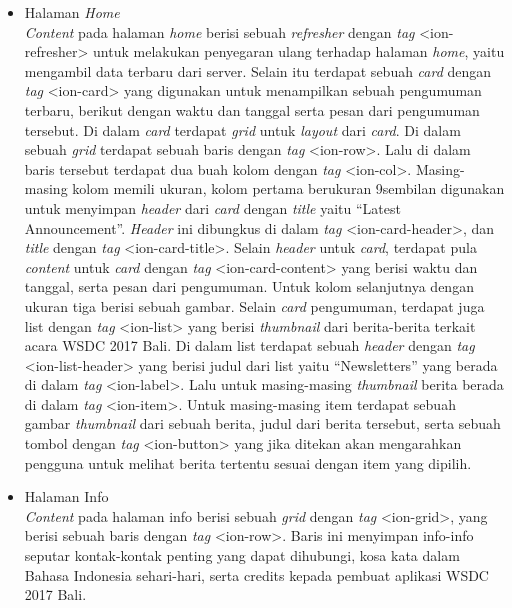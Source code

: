 \begin{enumerate}
\begin{itemize}
				\item Halaman \textit{Home} \\
					\textit{Content} pada halaman \textit{home} berisi sebuah \textit{refresher} dengan \textit{tag} <ion-refresher> untuk melakukan penyegaran ulang terhadap halaman \textit{home}, yaitu mengambil data terbaru dari server. Selain itu terdapat sebuah \textit{card} dengan \textit{tag} <ion-card> yang digunakan untuk menampilkan sebuah pengumuman terbaru, berikut dengan waktu dan tanggal serta pesan dari pengumuman tersebut. Di dalam \textit{card} terdapat \textit{grid} untuk \textit{layout} dari \textit{card}. Di dalam sebuah \textit{grid} terdapat sebuah baris dengan \textit{tag} <ion-row>. Lalu di dalam baris tersebut terdapat dua buah kolom dengan \textit{tag} <ion-col>. Masing-masing kolom memili ukuran, kolom pertama berukuran 9sembilan digunakan untuk menyimpan \textit{header} dari \textit{card} dengan \textit{title} yaitu ``Latest Announcement''. \textit{Header} ini dibungkus di dalam \textit{tag} <ion-card-header>, dan \textit{title} dengan \textit{tag} <ion-card-title>. Selain \textit{header} untuk \textit{card}, terdapat pula \textit{content} untuk \textit{card} dengan \textit{tag} <ion-card-content> yang berisi waktu dan tanggal, serta pesan dari pengumuman. Untuk kolom selanjutnya dengan ukuran tiga berisi sebuah gambar.
					Selain \textit{card} pengumuman, terdapat juga list dengan \textit{tag} <ion-list> yang berisi \textit{thumbnail} dari berita-berita terkait acara WSDC 2017 Bali. Di dalam list terdapat sebuah \textit{header} dengan \textit{tag} <ion-list-header> yang berisi judul dari list yaitu ``Newsletters'' yang berada di dalam \textit{tag} <ion-label>. Lalu untuk masing-masing \textit{thumbnail} berita berada di dalam \textit{tag} <ion-item>. Untuk masing-masing item terdapat sebuah gambar \textit{thumbnail} dari sebuah berita, judul dari berita tersebut, serta sebuah tombol dengan \textit{tag} <ion-button> yang jika ditekan akan mengarahkan pengguna untuk melihat berita tertentu sesuai dengan item yang dipilih.
				
				\item Halaman Info \\
					\textit{Content} pada halaman info berisi sebuah \textit{grid} dengan \textit{tag} <ion-grid>, yang berisi sebuah baris dengan \textit{tag} <ion-row>. Baris ini menyimpan info-info seputar kontak-kontak penting yang dapat dihubungi, kosa kata dalam Bahasa Indonesia sehari-hari, serta credits kepada pembuat aplikasi WSDC 2017 Bali.
					

\end{itemize}
\end{enumerate}
